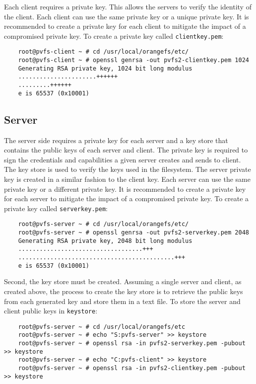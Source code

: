 \documentclass[11pt, letterpaper]{article}
\begin{document}
Each client requires a private key. This allows the servers to verify the 
identity of the client. Each client can use the same private key or a unique 
private key. It is recommended to create a private key for each client to 
mitigate the impact of a compromised private key. To create a private key 
called \texttt{clientkey.pem}:

\begin{verbatim}
    root@pvfs-client ~ # cd /usr/local/orangefs/etc/
    root@pvfs-client ~ # openssl genrsa -out pvfs2-clientkey.pem 1024
    Generating RSA private key, 1024 bit long modulus
    ......................++++++
    .........++++++
    e is 65537 (0x10001)
\end{verbatim}

\subsection{Server}

The server side requires a private key for each server and a key store that 
contains the public keys of each server and client. The private key is 
required to sign the credentials and capabilities a given server creates and 
sends to client. The key store is used to verify the keys used in the 
filesystem. The server private key is created in a similar fashion to the 
client key. Each server can use the same private key or a different private key.
It is recommended to create a private key for each server to mitigate the 
impact of a compromised private key. To create a private key called 
\texttt{serverkey.pem}:

\begin{verbatim}
    root@pvfs-server ~ # cd /usr/local/orangefs/etc/
    root@pvfs-server ~ # openssl genrsa -out pvfs2-serverkey.pem 2048
    Generating RSA private key, 2048 bit long modulus
    ...................................+++
    ............................................+++
    e is 65537 (0x10001)
\end{verbatim}

Second, the key store must be created. Assuming a single server and client, 
as created above, the process to create the key store is to retrieve the public
keys from each generated key and store them in a text file. To store the server
and client public keys in \texttt{keystore}:

\begin{verbatim}
    root@pvfs-server ~ # cd /usr/local/orangefs/etc
    root@pvfs-server ~ # echo "S:pvfs-server" >> keystore
    root@pvfs-server ~ # openssl rsa -in pvfs2-serverkey.pem -pubout >> keystore
    root@pvfs-server ~ # echo "C:pvfs-client" >> keystore
    root@pvfs-server ~ # openssl rsa -in pvfs2-clientkey.pem -pubout >> keystore
\end{verbatim}
\end{document}
